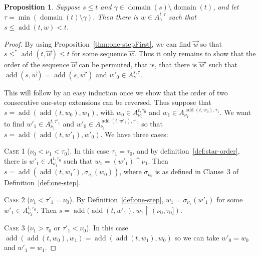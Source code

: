 \documentclass[
twoside,
]{article}
\newenvironment{case}[2]{\smallskip\par\noindent\textsc{Case #1} (#2).}{\smallskip}
\newtheorem{proposition}[theorem]{Proposition}
\theoremstyle{definition}
\theoremstyle{remark}
\DeclareMathOperator{\add}{add}
\newcommand{\scutdown}{{\uparrow}}
\newcommand{\restrict}{{\upharpoonright}}
\DeclareMathOperator{\domain}{domain}
\begin{document}
\begin{proposition}\label{thm:one-step-commute}
  Suppose $s\leq t$ and  $\gamma\in\domain(s)\setminus\domain(t)$, and
  let 
  $\tau=\min(\domain(t)\setminus\gamma)$.   Then there is $w\in
  A^{t,\tau}_{\gamma}$  such that $s\leq\add(t,w)<t$.
\end{proposition}

\begin{proof}
  By using Proposition~\ref{thm:one-stepFirst}, we can find $\vec w$
  so that $s\leq^* \add(t,\vec w)\leq t$ for some sequence $\vec w$.
  Thus it only remains to show that the order of the sequence $\vec w$
  can be   permuted, that is, that there is $\vec w'$ such that $\add(s,\vec
  w)=\add(s,\vec w')$ and $w'_{0}   \in A^{s,\tau}_{\gamma}$.   

  This will follow by an easy induction once we show that the order
  of two consecutive one-step extensions can be reversed.    
  Thus suppose that 
  $s=\add(\add(t,w_0),w_1)$, with  $w_0\in
  A^{t,\tau_0}_{\nu_0}$ and $w_1\in A^{\add(t,w_0),\tau_1}_{\nu_1}$.
  We want to find  $w'_1\in A^{t,\tau'_1}_{\nu_1}$ and $w'_0\in A^{\add(t,w'_1),\tau'_0}_{\nu_1}$
  so that $s=\add(\add(t, w'_1),w'_0)$.
  We have three cases:

  \begin{case}
    {1}{$\nu_0<\nu_1<\tau_0$}
    In this case $\tau_1=\tau_0$, and 
    by definition~\ref{def:star-order}, there is $w'_1\in
    A^{t,\tau_0}_{\nu_1}$ 
    such that $w_1=
    (w'_1)\scutdown\nu_1$.
    Then $s=\add(\add(t,w_1'),\sigma_{\nu_0}(w_0))$, where
    $\sigma_{\nu_0}$ is as defined in Clause~3 of Definition~\ref{def:one-step}.
  \end{case}
  \begin{case}{2}{$\nu_1<\tau'_1=\nu_0$}
    By Definition~\ref{def:one-step}, $w_1=\sigma_{\nu_1}(w'_1)$ for some
    $ w'_1\in A^{t,\tau_0}_{\nu_1}$.   Then $s=\add(\add(t,w'_1),w_1\restrict (\nu_0,\tau_0])$.
  \end{case}
  \begin{case}{3}{$\nu_1>\tau_0$ or $\tau'_1<\nu_0$}
    In this case $\add(\add(t, w_0),w_1)=\add(\add(t,w_1),w_0)$ so we
    can take $w'_0=w_0$ and $w'_1=w_1$.
  \end{case}
\end{proof}
\end{document}
